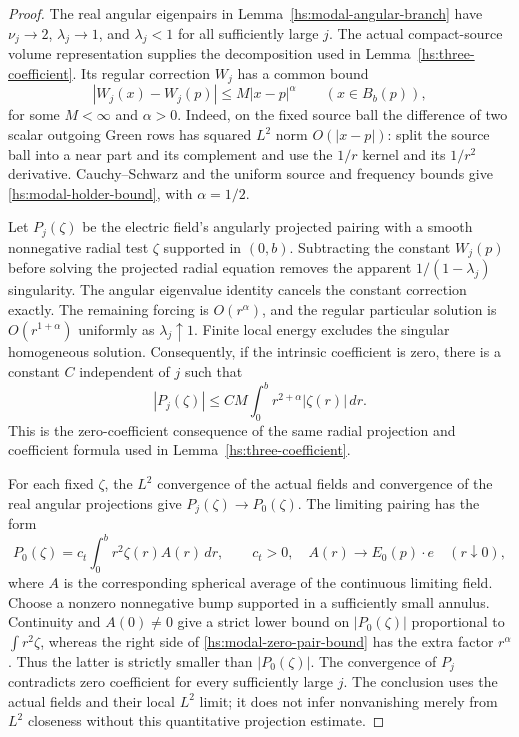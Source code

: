 \begin{proof}
The real angular eigenpairs in Lemma~\ref{hs:modal-angular-branch}
have $\nu_j\to2$, $\lambda_j\to1$, and $\lambda_j<1$ for
all sufficiently large $j$.  The actual compact-source volume
representation supplies the decomposition used in
Lemma~\ref{hs:three-coefficient}.  Its regular correction $W_j$
has a common bound
\begin{equation}
 |W_j(x)-W_j(p)|\leq M|x-p|^\alpha
 \qquad (x\in B_b(p)),
 \label{hs:modal-holder-bound}
\end{equation}
for some $M<\infty$ and $\alpha>0$.  Indeed, on the fixed source
ball the difference of two scalar outgoing Green rows has squared
$L^2$ norm $O(|x-p|)$: split the source ball into a near part and
its complement and use the $1/r$ kernel and its $1/r^2$ derivative.
Cauchy--Schwarz and the uniform source and frequency bounds give
\eqref{hs:modal-holder-bound}, with $\alpha=1/2$.

Let $P_j(\zeta)$ be the electric field's angularly projected pairing
with a smooth nonnegative radial test $\zeta$ supported in $(0,b)$.
Subtracting the constant $W_j(p)$ before solving the projected
radial equation removes the apparent $1/(1-\lambda_j)$ singularity.
The angular eigenvalue identity cancels the constant correction
exactly.  The remaining forcing is $O(r^\alpha)$, and the regular
particular solution is $O(r^{1+\alpha})$ uniformly as
$\lambda_j\uparrow1$.  Finite local energy excludes the singular
homogeneous solution.  Consequently, if the intrinsic coefficient
is zero, there is a constant $C$ independent of $j$ such that
\begin{equation}
 |P_j(\zeta)|\leq CM\int_0^b r^{2+\alpha}|\zeta(r)|\,dr.
 \label{hs:modal-zero-pair-bound}
\end{equation}
This is the zero-coefficient consequence of the same radial
projection and coefficient formula used in
Lemma~\ref{hs:three-coefficient}.

For each fixed $\zeta$, the $L^2$ convergence of the actual fields
and convergence of the real angular projections give
$P_j(\zeta)\to P_0(\zeta)$.  The limiting pairing has the form
\begin{equation}
 P_0(\zeta)=c_t\int_0^b r^2\zeta(r)A(r)\,dr,
 \qquad c_t>0,\quad A(r)\longrightarrow E_0(p)\cdot e
 \quad(r\downarrow0),
\end{equation}
where $A$ is the corresponding spherical average of the continuous
limiting field.  Choose a nonzero nonnegative bump supported in a
sufficiently small annulus.  Continuity and $A(0)\ne0$ give a
strict lower bound on $|P_0(\zeta)|$ proportional to
$\int r^2\zeta$, whereas the right side of
\eqref{hs:modal-zero-pair-bound} has the extra factor $r^\alpha$.
Thus the latter is strictly smaller than $|P_0(\zeta)|$.  The
convergence of $P_j$ contradicts zero coefficient for every
sufficiently large $j$.  The conclusion uses the actual fields and
their local $L^2$ limit; it does not infer nonvanishing merely from
$L^2$ closeness without this quantitative projection estimate.
\end{proof}

